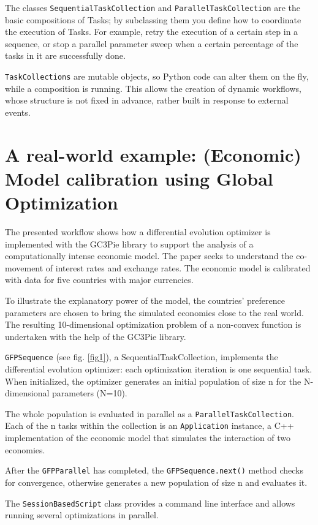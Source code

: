 \documentclass{PoS}
\begin{document}
The classes \texttt{SequentialTaskCollection} and
\texttt{ParallelTaskCollection} are the basic compositions of Tasks; by
subclassing them you define how to coordinate the execution of
Tasks. For example, retry the execution of a certain step in a
sequence, or stop a parallel parameter sweep when a certain percentage
of the tasks in it are successfully done. 
 
\texttt{TaskCollections} are mutable objects, so Python code can alter them on
the fly, while a composition is running. This allows the creation of
dynamic workflows, whose structure is not fixed in advance, rather
built in response to external events.

\section{A real-world example: (Economic) Model calibration using
  Global Optimization}

The presented workflow shows how a differential evolution optimizer is
implemented with the GC3Pie library to support the analysis of a
computationally intense economic model. The paper \cite{Jones2011}
seeks to understand the co-movement of interest rates and exchange
rates. The economic model is calibrated with data for five countries
with major currencies.
 
To illustrate the explanatory power of the model, the countries'
preference parameters are chosen to bring the simulated economies
close to the real world. The resulting 10-dimensional optimization
problem of a non-convex function is undertaken with the help of the
GC3Pie library. 

\texttt{GFPSequence} (see fig. \ref{fig1}), a
SequentialTaskCollection, implements the differential evolution
optimizer: each optimization iteration is one sequential task. When
initialized, the optimizer generates an initial population of size n
for the N-dimensional parameters (N=10).  

The whole population is evaluated in parallel as a
\texttt{ParallelTaskCollection}. Each of the n tasks within
the collection is an \texttt{Application} instance, a C++
implementation of the economic model that simulates the interaction of
two economies. 
 
After the \texttt{GFPParallel} has completed, the
\texttt{GFPSequence.next()} method checks for convergence, otherwise
generates  a new population of size n and evaluates it.


The \texttt{SessionBasedScript} class provides a command line interface and
allows running several optimizations in parallel.
\end{document}
